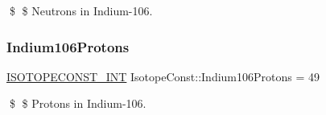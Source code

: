 \$ \$ Neutrons in Indium-\/106. \mbox{\label{group___isotope_const-_indium-_in106_gaacbb6675e826f3ef2fc6a0193fe88323}} 
\subsubsection{\texorpdfstring{Indium106\+Protons}{Indium106Protons}}
{\footnotesize\ttfamily \mbox{\hyperlink{group___isotope_const-_macros_ga5f18360b3e99483a35c32d789e62621c}{I\+S\+O\+T\+O\+P\+E\+C\+O\+N\+S\+T\+\_\+\+I\+NT}} Isotope\+Const\+::\+Indium106\+Protons = 49}

\$ \$ Protons in Indium-\/106. 